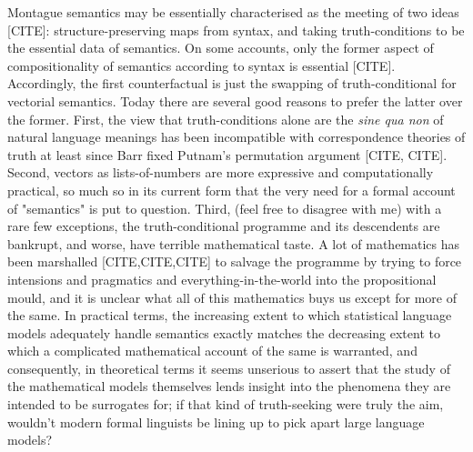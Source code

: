
Montague semantics may be essentially characterised as the meeting of two ideas [CITE]: structure-preserving maps from syntax, and taking truth-conditions to be the essential data of semantics. On some accounts, only the former aspect of compositionality of semantics according to syntax is essential [CITE]. Accordingly, the first counterfactual is just the swapping of truth-conditional for vectorial semantics. Today there are several good reasons to prefer the latter over the former. First, the view that truth-conditions alone are the \emph{sine qua non} of natural language meanings has been incompatible with correspondence theories of truth at least since Barr fixed Putnam's permutation argument [CITE, CITE]. Second, vectors as lists-of-numbers are more expressive and computationally practical, so much so in its current form that the very need for a formal account of "semantics" is put to question. Third, (feel free to disagree with me) with a rare few exceptions, the truth-conditional programme and its descendents are bankrupt, and worse, have terrible mathematical taste. A lot of mathematics has been marshalled [CITE,CITE,CITE] to salvage the programme by trying to force intensions and pragmatics and everything-in-the-world into the propositional mould, and it is unclear what all of this mathematics buys us except for more of the same. In practical terms, the increasing extent to which statistical language models adequately handle semantics exactly matches the decreasing extent to which a complicated mathematical account of the same is warranted, and consequently, in theoretical terms it seems unserious to assert that the study of the mathematical models themselves lends insight into the phenomena they are intended to be surrogates for; if that kind of truth-seeking were truly the aim, wouldn't modern formal linguists be lining up to pick apart large language models?\\

